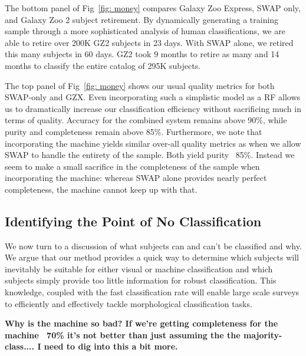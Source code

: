 \documentclass[twocolumn]{aastex6}
\begin{document}
The bottom panel of Fig~\ref{fig: money} compares  Galaxy Zoo Express, 
SWAP only, and Galaxy Zoo 2 subject retirement.
By dynamically generating a training sample
through a more sophisticated analysis of human classifications, we are able
to retire over 200K GZ2 subjects in 23 days.  With SWAP alone, we retired this
many subjects in 60 days. GZ2 took 9 months to retire as many and 14 months 
to classify the entire catalog of 295K subjects. 

The top panel of Fig~\ref{fig: money} shows our usual quality metrics for both 
SWAP-only and GZX.  Even incorporating such a simplistic model as a RF allows
us to dramatically increase our classification efficiency without sacrificing much 
in terms of quality. Accuracy for the combined system remains above 90\%, while
purity and completeness remain above 85\%. Furthermore, we note that 
incorporating the machine yields similar over-all quality metrics as when we 
allow SWAP to handle the entirety of the sample. Both yield purity ~85\%. 
Instead we seem to make a small sacrifice in the completeness of the sample
when incorporating the machine: whereas SWAP alone provides nearly perfect
completeness, the machine cannot keep up with that.

\subsection{Identifying the Point of No Classification}
We now turn to a discussion of what subjects can and can't be classified and why. 
We argue that our method provides a quick way to determine which subjects will
inevitably be suitable for either visual or machine classification and which subjects
simply provide too little information for robust classification. This knowledge, coupled
with the fast classification rate will enable large scale surveys to efficiently and effectively
tackle morphological classification tasks. 

 \textbf{Why is the machine so bad? If we're getting completeness for the machine ~70\% it's not better than just assuming the the majority-class.... I need to dig into this a bit more.}
\end{document}
